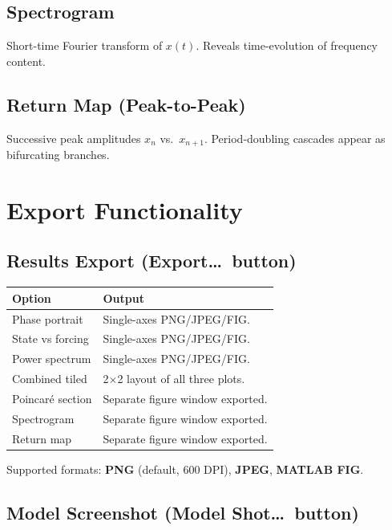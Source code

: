 \documentclass[12pt,a4paper]{article}
\begin{document}
\subsection{Spectrogram}
Short-time Fourier transform of $x(t)$.  Reveals time-evolution of frequency content.

\subsection{Return Map (Peak-to-Peak)}
Successive peak amplitudes $x_n$ vs.\ $x_{n+1}$.  Period-doubling cascades appear as bifurcating branches.

\section{Export Functionality}

\subsection{Results Export (Export\ldots\ button)}

\begin{center}
\begin{tabular}{lp{9cm}}
\toprule
\textbf{Option} & \textbf{Output}\\
\midrule
Phase portrait      & Single-axes PNG/JPEG/FIG.\\
State vs forcing    & Single-axes PNG/JPEG/FIG.\\
Power spectrum      & Single-axes PNG/JPEG/FIG.\\
Combined tiled      & 2$\times$2 layout of all three plots.\\
Poincar\'e section  & Separate figure window exported.\\
Spectrogram         & Separate figure window exported.\\
Return map          & Separate figure window exported.\\
\bottomrule
\end{tabular}
\end{center}

Supported formats: \textbf{PNG} (default, 600 DPI), \textbf{JPEG}, \textbf{MATLAB FIG}.

\subsection{Model Screenshot (Model Shot\ldots\ button)}
\end{document}

